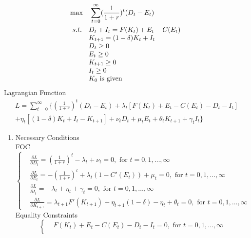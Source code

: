 \documentclass{article}
\begin{document}
\begin{enumerate}
        \begin{align*}
            & \max\quad\sum_{t=0}^\infty(\frac{1}{1+r})^t(D_t-E_t)\\
            &\begin{array}{r@{\quad}l}
                s.t.&D_t+I_t=F(K_t)+E_t-C(E_t)\\
                &K_{t+1}=(1-\delta)K_t+I_t\\
                &D_t\ge0\\
                &E_t\ge0\\
                &K_{t+1}\ge0\\
                &I_t\ge0\\
                &K_0\text{ is given}   
            \end{array}           
        \end{align*}
        Lagrangian Function
        \begin{multline*}
            L=\sum_{t=0}^\infty\{(\frac{1}{1+r})^t(D_t-E_t)+\lambda_t[F(K_t)+E_t-C(E_t)-D_t-I_t]\\
            +\eta_t[(1-\delta)K_t+I_t-K_{t+1}]+\nu_tD_t+\mu_tE_t+\theta_tK_{t+1}+\gamma_tI_t\}
        \end{multline*}
        \begin{enumerate}
            \item  Necessary Conditions\\
            FOC
            \begin{equation*}
                \left\{\begin{aligned}
                    &\frac{\partial L}{\partial D_t}=(\frac{1}{1+r})^t-\lambda_t+\nu_t=0,\text{ for }t=0,1,\dots,\infty\\
                    &\frac{\partial L}{\partial E_t}=-(\frac{1}{1+r})^t+\lambda_t(1-{C}'(E_t))+\mu_t=0,\text{ for }t=0,1,\dots,\infty\\
                    &\frac{\partial L}{\partial I_t}=-\lambda_t+\eta_t+\gamma_t=0,\text{ for }t=0,1,\dots,\infty\\
                    &\frac{\partial L}{\partial K_{t+1}}=\lambda_{t+1}{F}'(K_{t+1})+\eta_{t+1}(1-\delta)-\eta_t+\theta_t=0,\text{ for }t=0,1,\dots,\infty
                \end{aligned}\right.
            \end{equation*}
            Equality Constraints
            \begin{equation*}
                \left\{\begin{aligned}
                    &F(K_t)+E_t-C(E_t)-D_t-I_t=0,\text{ for }t=0,1,\dots,\infty\\

\end{aligned}
\end{equation*}
\end{enumerate}
\end{enumerate}
\end{document}
